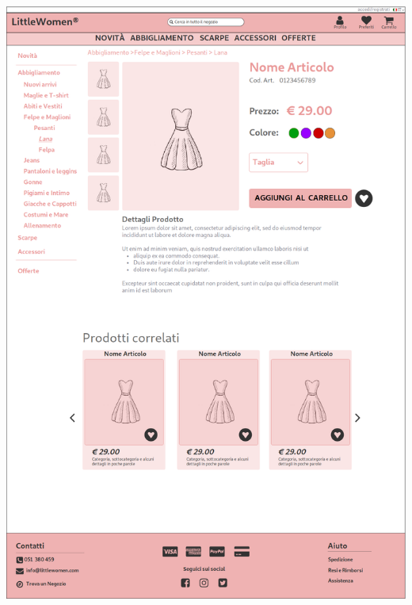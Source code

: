 \documentclass[12pt,a4paper]{report}
\begin{document}
\includegraphics[width=\textwidth]{"Project Management Sources/Wireframe/WireFrame Screenshot/Desktop/7 - Dettagli Prodotto"}
\end{document}
